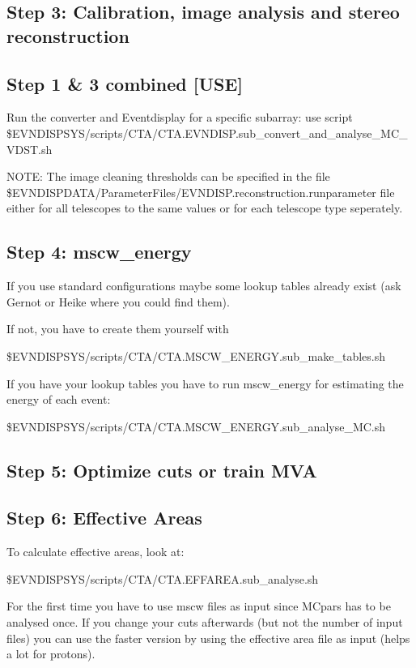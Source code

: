 \documentclass[titlepage,a4paper,twoside,11pt]{report}
\begin{document}
\subsection{Step 3: Calibration, image analysis and stereo reconstruction}

\subsection{Step 1 \& 3 combined [USE]}

Run the converter and Eventdisplay for a specific subarray: use script \$EVNDISPSYS/scripts/CTA/CTA.EVNDISP.sub\_convert\_and\_analyse\_MC\_VDST.sh

NOTE: The image cleaning thresholds can be specified in the file \$EVNDISPDATA/ParameterFiles/EVNDISP.reconstruction.runparameter file either
for all telescopes to the same values or for each telescope type seperately. 

\subsection{Step 4: mscw\_energy}

If you use standard configurations maybe some lookup tables already exist (ask Gernot or Heike where you could find them).

If not, you have to create them yourself with

\$EVNDISPSYS/scripts/CTA/CTA.MSCW\_ENERGY.sub\_make\_tables.sh

If you have your lookup tables you have to run mscw\_energy for estimating the energy of each event: 

\$EVNDISPSYS/scripts/CTA/CTA.MSCW\_ENERGY.sub\_analyse\_MC.sh

\subsection{Step 5: Optimize cuts or train MVA}

\subsection{Step 6: Effective Areas}

To calculate effective areas, look at:

\$EVNDISPSYS/scripts/CTA/CTA.EFFAREA.sub\_analyse.sh

For the first time you have to use mscw files as input since MCpars has to be analysed once. 
If you change your cuts afterwards (but not the number of input files) you can use the faster version by using
the effective area file as input (helps a lot for protons).
\end{document}
